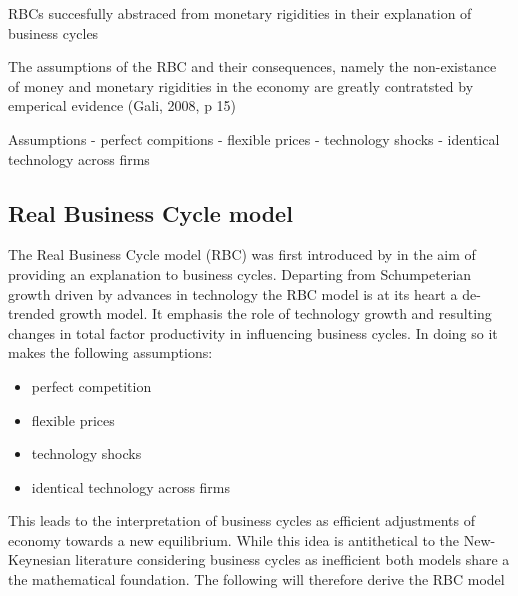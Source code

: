\documentclass[12pt,a4paper,english]{article} %
\begin{document}
	RBCs succesfully abstraced from monetary rigidities in their explanation of business cycles
	
	The assumptions of the RBC and their consequences, namely the non-existance of money and monetary rigidities in the economy are greatly contratsted by emperical evidence (Gali, 2008, p 15)
	
	Assumptions
	- perfect compitions
	- flexible prices
	- technology shocks
	- identical technology across firms
	
	
	\subsection{Real Business Cycle model}
	The Real Business Cycle model (RBC) was first introduced by \cite{prescott_theory_1986} in the aim of providing an explanation to business cycles. Departing from Schumpeterian growth driven by advances in technology the RBC model is at its heart a de-trended growth model. It emphasis the role of technology growth and resulting changes in total factor productivity in influencing business cycles. In doing so it makes the following assumptions:
	\begin{itemize}
		\item perfect competition
		\item flexible prices
		\item technology shocks
		\item identical technology across firms
	\end{itemize}
	This leads to the interpretation of business cycles as efficient adjustments of economy towards a new equilibrium. While this idea is antithetical to the New-Keynesian literature considering business cycles as inefficient both models share a the mathematical foundation. The following will therefore derive the RBC model
	
\end{document}
